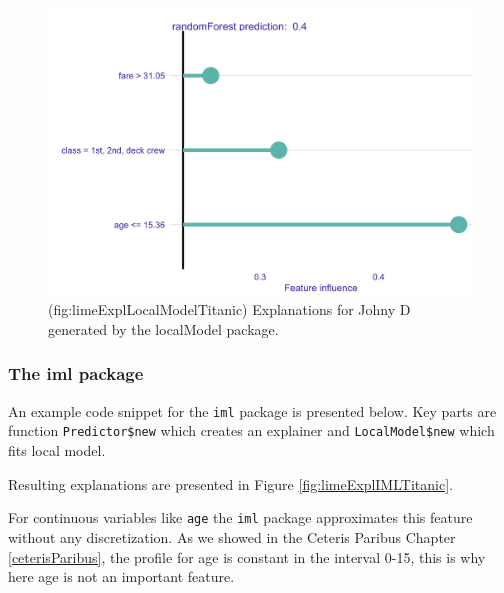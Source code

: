 \documentclass[12pt,]{krantz}
\theoremstyle{definition}
\theoremstyle{definition}
\theoremstyle{definition}
\theoremstyle{remark}
\begin{document}
\begin{figure}

{\centering \includegraphics[width=0.8\linewidth]{figure/lime_expl_localModel_titanic} 

}

\caption{(fig:limeExplLocalModelTitanic) Explanations for Johny D generated by the localModel package. }\label{fig:limeExplLocalModelTitanic}
\end{figure}

\hypertarget{the-iml-package}{%
\subsubsection{\texorpdfstring{\textbf{The iml
package}}{The iml package}}\label{the-iml-package}}

An example code snippet for the \texttt{iml} package is presented below.
Key parts are function \texttt{Predictor\$new} which creates an
explainer and \texttt{LocalModel\$new} which fits local model.

Resulting explanations are presented in Figure
\ref{fig:limeExplIMLTitanic}.

For continuous variables like \texttt{age} the \texttt{iml} package
approximates this feature without any discretization. As we showed in
the Ceteris Paribus Chapter \ref{ceterisParibus}, the profile for age is
constant in the interval 0-15, this is why here age is not an important
feature.
\end{document}
